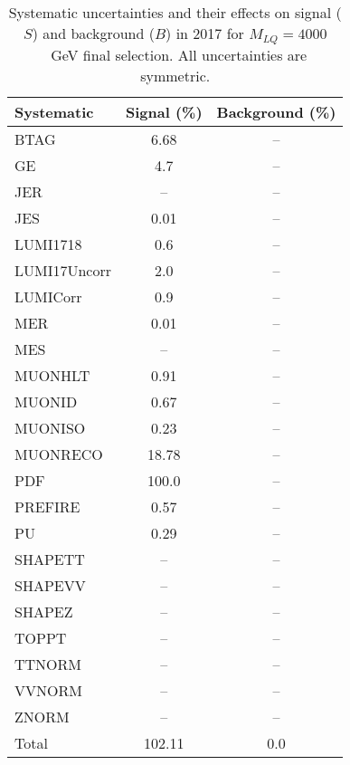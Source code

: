 \begin{table}[htbp]
\begin{center}
\caption{Systematic uncertainties and their effects on signal ($S$) and background ($B$) in 2017 for $M_{LQ}=4000$~GeV final selection. All uncertainties are symmetric.}
\begin{tabular}{lcc}
\hline\hline
Systematic & Signal (\%) & Background (\%) \\ \hline 
BTAG & 6.68 & --\\ 
GE & 4.7 & --\\ 
JER & -- & --\\ 
JES & 0.01 & --\\ 
LUMI1718 & 0.6 & --\\ 
LUMI17Uncorr & 2.0 & --\\ 
LUMICorr & 0.9 & --\\ 
MER & 0.01 & --\\ 
MES & -- & --\\ 
MUONHLT & 0.91 & --\\ 
MUONID & 0.67 & --\\ 
MUONISO & 0.23 & --\\ 
MUONRECO & 18.78 & --\\ 
PDF & 100.0 & --\\ 
PREFIRE & 0.57 & --\\ 
PU & 0.29 & --\\ 
SHAPETT & -- & --\\ 
SHAPEVV & -- & --\\ 
SHAPEZ & -- & --\\ 
TOPPT & -- & --\\ 
TTNORM & -- & --\\ 
VVNORM & -- & --\\ 
ZNORM & -- & --\\ 
Total & 102.11 & 0.0\\ \hline \hline
\end{tabular}
\label{tab:SysUncertainties_uujj_4000}
\end{center}
\end{table}

